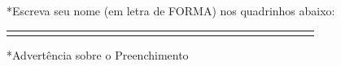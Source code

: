 \documentclass[14pt]{report}
\begin{document}
*Escreva seu nome (em letra de FORMA) nos quadrinhos abaixo:
\begin{center}
 \begin{tabular}{|p{0.3cm}|p{0.3cm}|p{0.3cm}|p{0.3cm}|p{0.3cm}|p{0.3cm}|p{0.3cm}|p{0.3cm}|p{0.3cm}|p{0.3cm}|p{0.3cm}|p{0.3cm}|p{0.3cm}|p{0.3cm}|p{0.3cm}|p{0.3cm}|p{0.3cm}|p{0.3cm}|p{0.3cm}|p{0.3cm}|p{0.3cm}|p{0.3cm}|p{0.3cm}|p{0.3cm}|p{0.3cm}|p{0.3cm}|p{0.3cm}|}
 \hline  
&  &  &  &  &  &  &  &  &  &  &  &  &  &  &  &  &  &  &  &  &  &  &  &  &  &    \\ 
\hline  &  &  &  &  &  &  &  &  &  &  &  &  &  &  &  &  &  &  &  &  &  &  &  &  &  &    \\ 
\hline 
\end{tabular}
\end{center}
*Advertência sobre o Preenchimento\\
\end{document}
